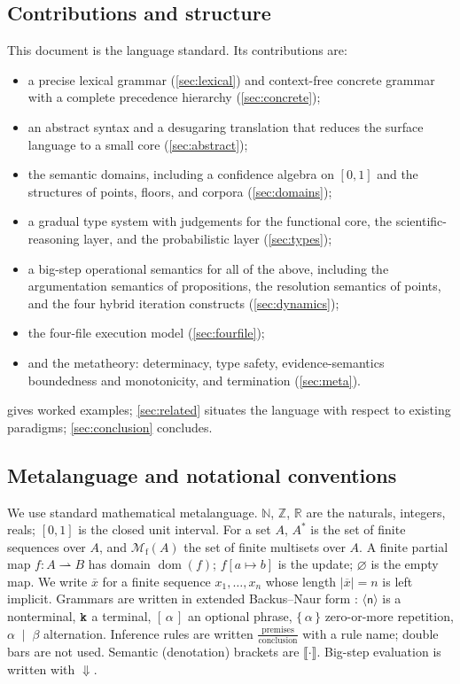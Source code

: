 \documentclass[11pt,a4paper]{article}
\theoremstyle{plain}
\theoremstyle{definition}
\theoremstyle{remark}
\newcommand{\nt}[1]{\ensuremath{\langle\textsf{#1}\rangle}}  %
\newcommand{\tm}[1]{\textbf{\texttt{#1}}}                 %
\newcommand{\opt}[1]{\ensuremath{[\,#1\,]}}               %
\newcommand{\rep}[1]{\ensuremath{\{\,#1\,\}}}             %
\newcommand{\bnfor}{\;\mid\;}
\newcommand{\sem}[1]{\ensuremath{\llbracket #1 \rrbracket}} %
\DeclareMathOperator{\dom}{dom}                           %
\newcommand{\evalto}{\Downarrow}
\newcommand{\Unit}{[0,1]}
\begin{document}
\subsection{Contributions and structure}

This document is the language standard. Its contributions are:

\begin{itemize}[leftmargin=1.4em]
\item a precise lexical grammar (\cref{sec:lexical}) and context-free concrete
grammar with a complete precedence hierarchy (\cref{sec:concrete});
\item an abstract syntax and a desugaring translation that reduces the surface
language to a small core (\cref{sec:abstract});
\item the semantic domains, including a confidence algebra on $\Unit$ and the
structures of points, floors, and corpora (\cref{sec:domains});
\item a gradual type system with judgements for the functional core, the
scientific-reasoning layer, and the probabilistic layer (\cref{sec:types});
\item a big-step operational semantics for all of the above, including the
argumentation semantics of propositions, the resolution semantics of points,
and the four hybrid iteration constructs (\cref{sec:dynamics});
\item the four-file execution model (\cref{sec:fourfile});
\item and the metatheory: determinacy, type safety, evidence-semantics
boundedness and monotonicity, and termination (\cref{sec:meta}).
\end{itemize}

 gives worked examples; \cref{sec:related} situates the
language with respect to existing paradigms; \cref{sec:conclusion} concludes.

\subsection{Metalanguage and notational conventions}
\label{sec:notation}

We use standard mathematical metalanguage. $\mathbb{N}$, $\mathbb{Z}$,
$\mathbb{R}$ are the naturals, integers, reals; $\Unit$ is the closed unit
interval. For a set $A$, $A^{*}$ is the set of finite sequences over $A$, and
$\mathcal{M}_{\mathrm{f}}(A)$ the set of finite multisets over $A$. A finite
partial map $f\colon A \rightharpoonup B$ has domain $\dom(f)$; $f[a\mapsto b]$
is the update; $\varnothing$ is the empty map. We write $\overline{x}$ for a
finite sequence $x_1,\dots,x_n$ whose length $|\overline{x}|=n$ is left
implicit. Grammars are written in extended Backus--Naur form
\citep{backus1959,naur1963}: $\nt{n}$ is a nonterminal, $\tm{k}$ a terminal,
$\opt{\alpha}$ an optional phrase, $\rep{\alpha}$ zero-or-more repetition,
$\alpha\bnfor\beta$ alternation. Inference rules are written
$\frac{\text{premises}}{\text{conclusion}}$ with a rule name; double bars are
not used. Semantic (denotation) brackets are $\sem{\cdot}$. Big-step evaluation
is written with $\evalto$.
\end{document}
